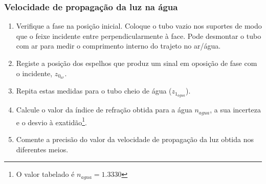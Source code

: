 \documentclass[a4paper,12pt]{article}      %
\begin{document}
\subsubsection{\sf Velocidade de propagação da luz na água}
\begin{enumerate}
\item Verifique a fase na posição inicial. Coloque o tubo vazio  nos suportes de modo que o feixe incidente entre perpendicularmente à face. Pode desmontar o tubo com ar para medir o comprimento interno do trajeto no ar/água.
\item Registe a posição dos espelhos que produz um sinal em oposição de fase com o incidente, $z_{0_{ar}}$. 
\item Repita estas medidas para o tubo cheio de água ($z_{1_{agua}}$). 
\item Calcule o valor da índice de refração obtida para a água $n_{agua}$, a sua incerteza e o desvio à exatidão\footnote{O valor tabelado é $n_{agua}=1.3330$}. 
\item Comente a precisão do valor da velocidade de propagação da luz obtida nos 
diferentes meios.
\end{enumerate}
\end{document}
